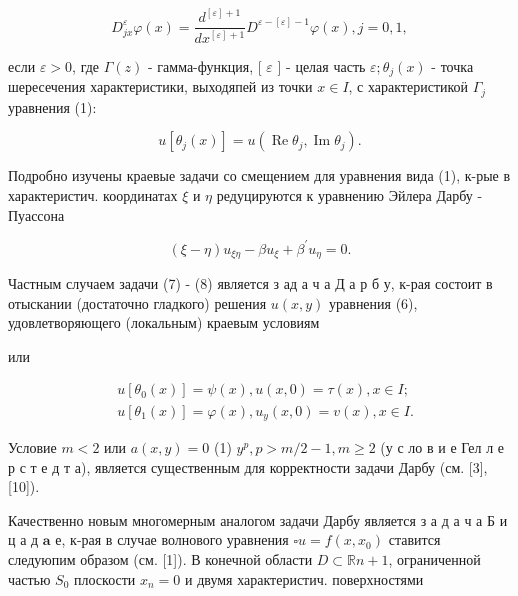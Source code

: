 \documentclass[10pt]{article}
\begin{document}
\[

D_{j x}^{\varepsilon} \varphi(x)=\frac{d^{[\varepsilon]+1}}{d x^{[\varepsilon]+1}} D^{\varepsilon-[\varepsilon]-1} \varphi(x), j=0,1,

\]



если $\varepsilon>0$, где $\Gamma(z)$ - гамма-функция, [ $\varepsilon$ ] - целая часть $\varepsilon ; \theta_{j}(x)$ - точка шересечения характеристики, выходяпей из точки $x \in I$, с характеристикоӥ $\Gamma_{j}$ уравнения (1):



\[

u\left[\theta_{j}(x)\right]=u\left(\operatorname{Re} \theta_{j}, \operatorname{Im} \theta_{j}\right) .

\]



Подробно изучены краевые задачи со смещением для уравнения вида (1), к-рые в характеристич. координатах $\xi$ и $\eta$ редуцируются к уравнению Эйлера Дарбу - Пуассона



\[

(\xi-\eta) u_{\xi \eta}-\beta u_{\xi}+\beta^{\prime} u_{\eta}=0 .

\]



Частным случаем задачи (7) - (8) является з ад а ч а Д а р б у, к-рая состоит в отыскании (достаточно гладкого) решения $u(x, y)$ уравнения (6), удовлетворяющего (локальным) краевым условиям



или



\[

\begin{aligned}

& u\left[\theta_{0}(x)\right]=\psi(x), u(x, 0)=\tau(x), x \in I ; \\

& u\left[\theta_{1}(x)\right]=\varphi(x), u_{y}(x, 0)=v(x), x \in I .

\end{aligned}

\]



Условие $m<2$ или $a(x, y)=0$ (1) $y^{p}, p>m / 2-1, m \geqslant 2$ (у с ло в и е Гел л е р с т е д т а), является существенным для корректности задачи Дарбу (см. [3], [10]).



Качественно новым многомерным аналогом задачи Дарбу является з а д а ч а Б и ц а д $\mathbf{a}$ е, к-рая в случае волнового уравнения $\square u=f\left(x, x_{0}\right)$ ставится следуюпим образом (см. [1]). В конечной области $D \subset \mathbb{R} n+1$, ограниченной частью $S_{0}$ плоскости $x_{n}=0$ и двумя характеристич. поверхностями
\end{document}

